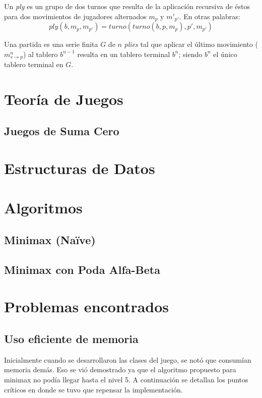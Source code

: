 \documentclass[10pt,a4paper,notitlepage,twocolumn,draft]{article}
\newenvironment{definition}[1][Definición]{\begin{trivlist}
\item[\hskip \labelsep {\bfseries #1}]}{\end{trivlist}}
\begin{document}
\begin{definition}
Un \textit{ply} es un grupo de dos turnos que resulta de la aplicación recursiva de éstos para dos movimientos de jugadores alternados $m_p$ y $m'_{p'}$. En otras palabras: 
\begin{equation}
ply(b, m_p, m_{p'}) = turno(turno(b, p, m_p), p', m_{p'})
\end{equation}
\end{definition}

\begin{definition}
Una partida es una serie finita $G$ de $n$ \textit{plies} tal que aplicar el último movimiento ($m^{n}_{s \rightarrow p}$) al tablero $b^{n - 1}$ resulta en un tablero terminal $b^{n}$; siendo $b^{n}$ el único tablero terminal en $G$.
\end{definition}

\section{Teoría de Juegos}
\subsection{Juegos de Suma Cero}
\section{Estructuras de Datos}
\section{Algoritmos}
\subsection{Minimax (Na\"ive)}
\subsection{Minimax con Poda Alfa-Beta}
\section{Problemas encontrados}
\subsection{Uso eficiente de memoria}
  Inicialmente cuando se desarrollaron las clases del juego, se notó que consumían memoria demás.
  Eso se vió demostrado ya que el algoritmo propuesto para minimax no podía llegar hasta el nivel 5.
  A continuación se detallan los puntos críticos en donde se tuvo que repensar la implementación.
\end{document}
